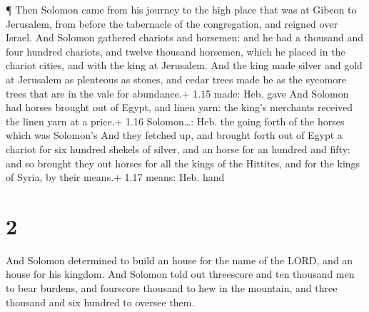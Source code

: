  ¶ Then Solomon came from his journey to the high place
that was at Gibeon to Jerusalem, from before the tabernacle of the
congregation, and reigned over Israel.  And Solomon
gathered chariots and horsemen: and he had a thousand and four hundred
chariots, and twelve thousand horsemen, which he placed in the chariot
cities, and with the king at Jerusalem.  And the king made
silver and gold at Jerusalem as plenteous as stones, and cedar trees
made he as the sycomore trees that are in the vale for abundance.+ 1.15
made: Heb. gave  And Solomon had horses brought out of
Egypt, and linen yarn: the king's merchants received the linen yarn at a
price.+ 1.16 Solomon\ldots: Heb. the going forth of the horses which was
Solomon's  And they fetched up, and brought forth out of
Egypt a chariot for six hundred shekels of silver, and an horse for an
hundred and fifty: and so brought they out horses for all the kings of
the Hittites, and for the kings of Syria, by their means.+ 1.17 means:
Heb. hand

\hypertarget{section-1}{%
\section{2}\label{section-1}}

 And Solomon determined to build an house for the name of
the LORD, and an house for his kingdom.  And Solomon told
out threescore and ten thousand men to bear burdens, and fourscore
thousand to hew in the mountain, and three thousand and six hundred to
oversee them.

